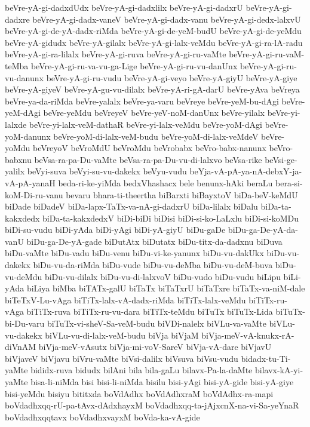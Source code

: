 {beVre-yA-gi-dadxdUdx
beVre-yA-gi-dadxlilx
beVre-yA-gi-dadxrU
beVre-yA-gi-dadxre
beVre-yA-gi-dadx-vaneV
beVre-yA-gi-dadx-vanu
beVre-yA-gi-dedx-lalxvU
beVre-yA-gi-de-yA-dadx-riMda
beVre-yA-gi-de-yeM-budU
beVre-yA-gi-de-yeMdu
beVre-yA-gidudx
beVre-yA-gilalx
beVre-yA-gi-lalx-veMdu
beVre-yA-gi-ra-lA-radu
beVre-yA-gi-ra-lilalx
beVre-yA-gi-ruva
beVre-yA-gi-ru-vaMte
beVre-yA-gi-ru-vaM-teMba
beVre-yA-gi-ru-va-vu-ga-Lige
beVre-yA-gi-ru-vu-danUnx
beVre-yA-gi-ru-vu-danunx
beVre-yA-gi-ru-vudu
beVre-yA-gi-veyo
beVre-yA-giyU
beVre-yA-giye
beVre-yA-giyeV
beVre-yA-gu-vu-dilalx
beVre-yA-ri-gA-darU
beVre-yAva
beVreya
beVre-ya-da-riMda
beVre-yalalx
beVre-ya-varu
beVreye
beVre-yeM-bu-dAgi
beVre-yeM-dAgi
beVre-yeMdu
beVreyeV
beVre-yeV-noM-danUnx
beVre-yilalx
beVre-yi-lalxde
beVre-yi-lalx-veM-dathaR
beVre-yi-lalx-veMdu
beVre-yoM-dAgi
beVre-yoM-danunx
beVre-yoM-di-lalx-veM-budu
beVre-yoM-di-lalx-veMdeV
beVre-yoMdu
beVreyoV
beVroMdU
beVroMdu
beVrobabx
beVro-babx-nanunx
beVro-babxnu
beVsa-ra-pa-Du-vaMte
beVsa-ra-pa-Du-vu-di-lalxvo
beVsa-rike
beVsi-ge-yalilx
beVyi-suva
beVyi-su-vu-dakekx
beVyu-vudu
beYja-vA-pA-ya-nA-debxY-ja-vA-pA-yanaH
beda-ri-ke-yiMda
bedxVhashacx
bele
benunx-hAki
beraLu
bera-si-koM-Di-ru-vanu
bevaru
bhara-ti-theertha
biBarxti
biBayxtoV
biDa-beV-keMdU
biDade
biDadeV
biDa-lapx-TaTx-va-nA-gi-dadxrU
biDa-lilalx
biDalu
biDa-ta-kakxdedx
biDa-ta-kakxdedxV
biDi-biDi
biDisi
biDi-si-ko-LaLxlu
biDi-si-koMDu
biDi-su-vudu
biDi-yAda
biDi-yAgi
biDi-yA-giyU
biDu-gaDe
biDu-ga-De-yA-da-vanU
biDu-ga-De-yA-gade
biDutAtx
biDutatx
biDu-titx-da-dadxnu
biDuva
biDu-vaMte
biDu-vadu
biDu-venu
biDu-vi-ke-yanunx
biDu-vu-dakUkx
biDu-vu-dakekx
biDu-vu-da-riMda
biDu-vude
biDu-vu-deMba
biDu-vu-deM-buva
biDu-vu-deMdu
biDu-vu-dilalx
biDu-vu-di-lalxvoV
biDu-vudo
biDu-vudu
biLipu
biLi-yAda
biLiya
biMba
biTATx-galU
biTaTx
biTaTxrU
biTaTxre
biTaTx-va-niM-dale
biTeTxV-Lu-vAga
biTiTx-lalx-vA-dadx-riMda
biTiTx-lalx-veMdu
biTiTx-ru-vAga
biTiTx-ruva
biTiTx-ru-vu-dara
biTiTx-teMdu
biTuTx
biTuTx-Lida
biTuTx-bi-Du-varu
biTuTx-vi-sheV-Sa-veM-budu
biVDi-nalelx
biVLu-va-vaMte
biVLu-vu-dakekx
biVLu-vu-di-lalx-veM-budu
biVja
biVjaM
biVja-meV-vA-knukx-rA-diVnAM
biVja-meV-vAsutx
biVja-mi-voV-SareV
biVja-vA-dare
biVjavU
biVjaveV
biVjavu
biVru-vaMte
biVsi-dalilx
biVsuva
biVsu-vudu
bidadx-tu-Ti-yaMte
bididx-ruva
bidudx
bilAni
bila
bila-gaLu
bilavx-Pa-la-daMte
bilavx-kA-yi-yaMte
bisa-li-niMda
bisi
bisi-li-niMda
bisilu
bisi-yAgi
bisi-yA-gide
bisi-yA-giye
bisi-yeMdu
bisiyu
bititxda
boVdAdhx
boVdAdhxraM
boVdAdhx-ra-mapi
boVdadhxqq-rU-pa-tAvx-dAdxhayxM
boVdadhxqq-ta-jAjxcnX-na-vi-Sa-yeYnaR
boVdadhxqqtavx
boVdadhxvayxM
boVda-ka-vA-gide
}
